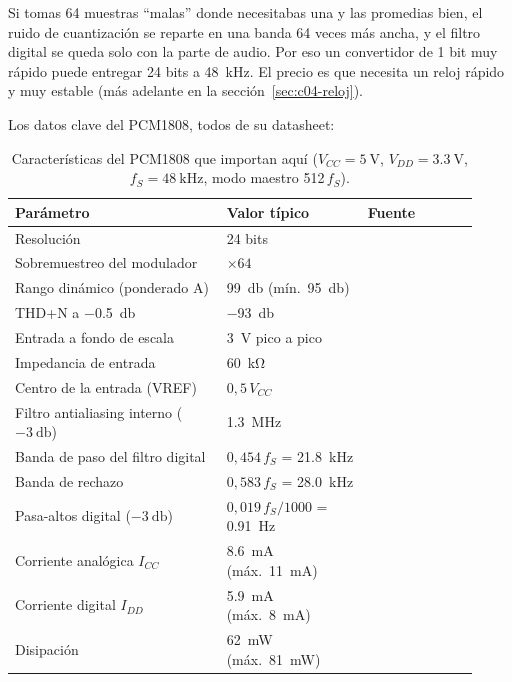 \begin{idea}[sobremuestreo]
Si tomas 64 muestras ``malas'' donde necesitabas una y las promedias bien, el ruido de cuantización se reparte en una banda 64 veces más ancha, y el filtro digital se queda solo con la parte de audio. Por eso un convertidor de 1 bit muy rápido puede entregar 24 bits a \SI{48}{\kilo\hertz}. El precio es que necesita un reloj rápido y muy estable (más adelante en la sección~\ref{sec:c04-reloj}).
\end{idea}

Los datos clave del PCM1808, todos de su datasheet:

\begin{table}[h]
\centering
\caption{Características del PCM1808 que importan aquí ($V_{CC}=\SI{5}{\volt}$, $V_{DD}=\SI{3.3}{\volt}$, $f_S=\SI{48}{\kilo\hertz}$, modo maestro 512\,$f_S$).}\label{tab:c04-pcm}
\begin{tabular}{@{}L{0.42\linewidth}L{0.28\linewidth}L{0.22\linewidth}@{}}\toprule
Parámetro & Valor típico & Fuente\\\midrule
Resolución & 24 bits & \\
Sobremuestreo del modulador & $\times 64$ & \\
Rango dinámico (ponderado A) & \SI{99}{\decibel} (mín.\ \SI{95}{\decibel}) & \\
THD+N a \SI{-0.5}{\decibel} & \SI{-93}{\decibel} & \\
Entrada a fondo de escala & \SI{3}{\volt} pico a pico & \\
Impedancia de entrada & \SI{60}{\kilo\ohm} & \\
Centro de la entrada (VREF) & $0{,}5\,V_{CC}$ & \\
Filtro antialiasing interno ($-\SI{3}{\decibel}$) & \SI{1.3}{\mega\hertz} & \\
Banda de paso del filtro digital & $0{,}454\,f_S$ = \SI{21.8}{\kilo\hertz} & \\
Banda de rechazo & $0{,}583\,f_S$ = \SI{28.0}{\kilo\hertz} & \\
Pasa-altos digital ($-\SI{3}{\decibel}$) & $0{,}019\,f_S/1000$ = \SI{0.91}{\hertz} & \\
Corriente analógica $I_{CC}$ & \SI{8.6}{\milli\ampere} (máx.\ \SI{11}{\milli\ampere}) & \\
Corriente digital $I_{DD}$ & \SI{5.9}{\milli\ampere} (máx.\ \SI{8}{\milli\ampere}) & \\
Disipación & \SI{62}{\milli\watt} (máx.\ \SI{81}{\milli\watt}) & \\
\bottomrule
\end{tabular}
\end{table}

